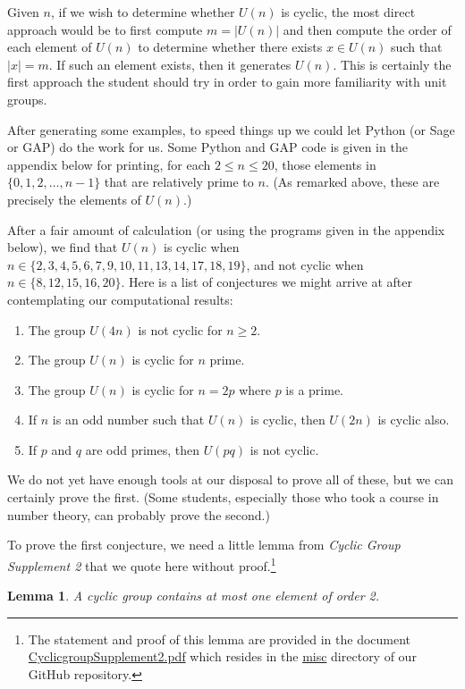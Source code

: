 \documentclass[12pt,reqno]{amsart}
\newcommand{\<}{\ensuremath{\langle}}
\renewcommand{\>}{\ensuremath{\rangle}}
\newtheorem*{lemma}{Lemma}
\begin{document}
\begin{enumerate}
Given $n$, if we wish to determine whether $U(n)$ is cyclic, the most direct
approach would be to first compute $m = |U(n)|$ and then compute the order of
each element of $U(n)$ to determine whether there exists 
$x \in U(n)$ such that $|x| = m$.  If such an element exists, then it generates
$U(n)$. This is certainly the first approach the student should try in order to
gain more familiarity with unit groups.

After generating some examples, to speed things up we could let Python (or
Sage or GAP) do the work for us.  Some Python and GAP code is given in the
appendix below for printing, for each $2\leq n \leq 20$, those elements in 
$\{0, 1, 2, \dots, n-1\}$ that are relatively prime to $n$.
(As remarked above, these are precisely the elements of $U(n)$.) 

After a fair amount of calculation (or using the programs given in the
appendix below), we find that $U(n)$ is cyclic when 
$n \in \{2, 3, 4, 5, 6, 7, 9, 10, 11, 13, 14, 17, 18, 19\}$, and not cyclic 
when $n \in \{8, 12, 15, 16, 20\}$. 
Here is a list of conjectures we might arrive at after contemplating our
computational results:
\begin{enumerate}
\item 
The group $U(4n)$ is not cyclic for $n \geq 2$.
\item The group $U(n)$ is cyclic for $n$ prime.
\item The group $U(n)$ is cyclic for $n = 2p$ where $p$ is a prime.
\item If $n$ is an odd number such that $U(n)$ is cyclic, then $U(2n)$ 
is cyclic also.
\item If $p$ and $q$ are odd primes, then $U(pq)$ is not cyclic.
\end{enumerate}
We do not yet have enough tools at our disposal to prove all of these,
but we can certainly prove the first. (Some students, especially those who
took a course in number theory, can probably prove the second.)

To prove the first conjecture, we need a little lemma from 
\emph{Cyclic Group Supplement 2} 
that we quote here without proof.\footnote{The statement and proof
  of this lemma are provided in the document 
  \href{https://github.com/williamdemeo/Math301-Fall2014/blob/master/misc/CyclicgroupSupplement2.pdf}{CyclicgroupSupplement2.pdf}
  which resides in the
  \href{https://github.com/williamdemeo/Math301-Fall2014/tree/master/misc}{misc}
  directory of our GitHub repository. 
}
\begin{lemma}
A cyclic group contains at most one element of order 2.  
\end{lemma}


\end{enumerate}
\end{document}
